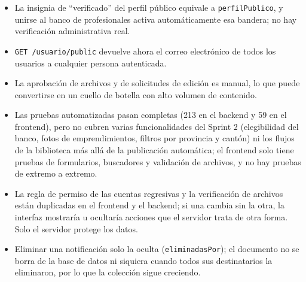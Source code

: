 \begin{itemize}
    \item La insignia de ``verificado'' del perfil público equivale a \texttt{perfilPublico}, y unirse al banco de profesionales activa automáticamente esa bandera; no hay verificación administrativa real.
    \item \texttt{GET /usuario/public} devuelve ahora el correo electrónico de todos los usuarios a cualquier persona autenticada.
    \item La aprobación de archivos y de solicitudes de edición es manual, lo que puede convertirse en un cuello de botella con alto volumen de contenido.
    \item Las pruebas automatizadas pasan completas (213 en el backend y 59 en el frontend), pero no cubren varias funcionalidades del Sprint 2 (elegibilidad del banco, fotos de emprendimientos, filtros por provincia y cantón) ni los flujos de la biblioteca más allá de la publicación automática; el frontend solo tiene pruebas de formularios, buscadores y validación de archivos, y no hay pruebas de extremo a extremo.
    \item La regla de permiso de las cuentas regresivas y la verificación de archivos están duplicadas en el frontend y el backend; si una cambia sin la otra, la interfaz mostraría u ocultaría acciones que el servidor trata de otra forma. Solo el servidor protege los datos.
    \item Eliminar una notificación solo la oculta (\texttt{eliminadasPor}); el documento no se borra de la base de datos ni siquiera cuando todos sus destinatarios la eliminaron, por lo que la colección sigue creciendo.
\end{itemize}

